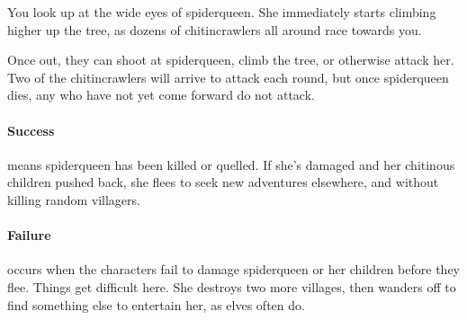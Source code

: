 \begin{boxtext}

  You look up at the wide eyes of \gls{spiderqueen}.
  She immediately starts climbing higher up the tree, as dozens of chitincrawlers all around race towards you.

\end{boxtext}

Once out, they can shoot at \gls{spiderqueen}, climb the tree, or otherwise attack her.
Two of the chitincrawlers will arrive to attack each round, but once \gls{spiderqueen} dies, any who have not yet come forward do not attack.

\keras

\showStdSpells



\spiderqueen

\showStdSpells[
  
  
  \setcounter{enc}{3}
]


\paragraph{Success} means \gls{spiderqueen} has been killed or quelled.
If she's damaged and her chitinous children pushed back, she flees to seek new adventures elsewhere, and without killing random villagers.

\paragraph{Failure} occurs when the characters fail to damage \gls{spiderqueen} or her children before they flee.
Things get difficult here.
She destroys two more \glspl{village}, then wanders off to find something else to entertain her, as elves often do.

\stopcontents[sq]
